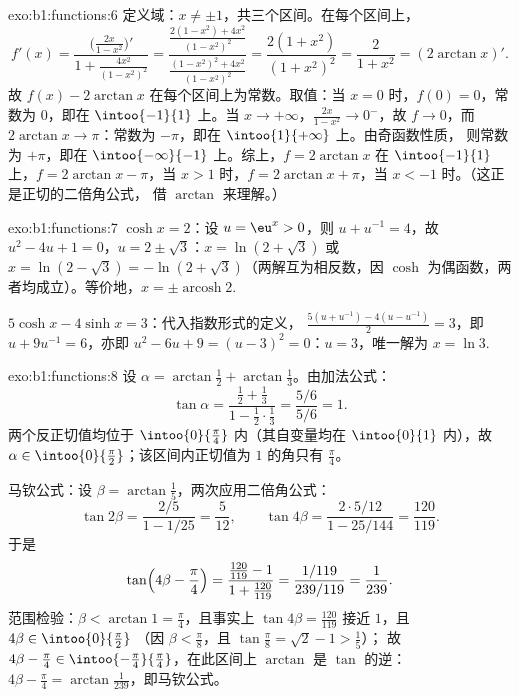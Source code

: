 \begin{solution}{exo:b1:functions:6}
定义域：$x \neq \pm 1$，共三个区间。在每个区间上，
\[
f'(x) = \frac{\bigl(\frac{2x}{1-x^2}\bigr)'}{1 +
\frac{4x^2}{(1-x^2)^2}}
= \frac{\frac{2(1-x^2) + 4x^2}{(1-x^2)^2}}
{\frac{(1-x^2)^2 + 4x^2}{(1-x^2)^2}}
= \frac{2(1 + x^2)}{(1 + x^2)^2} = \frac{2}{1 + x^2}
= (2\arctan x)' .
\]
故 $f(x) - 2\arctan x$ 在每个区间上为常数。取值：当 $x =
0$ 时，$f(0) = 0$，常数为 $0$，即在 $\intoo{-1}{1}$ 上。当 $x \to
+\infty$，$\frac{2x}{1-x^2} \to 0^-$，故 $f \to 0$，而 $2\arctan x
\to \pi$：常数为 $-\pi$，即在 $\intoo{1}{+\infty}$ 上。由奇函数性质，
则常数为 $+\pi$，即在 $\intoo{-\infty}{-1}$ 上。综上，$f = 2\arctan x$ 在
$\intoo{-1}{1}$ 上，$f = 2\arctan x - \pi$，当 $x > 1$ 时，$f = 2\arctan x +
\pi$，当 $x < -1$ 时。（这正是正切的二倍角公式，
借 $\arctan$ 来理解。）
\end{solution}

\begin{solution}{exo:b1:functions:7}
$\cosh x = 2$：设 $u = \eu^x > 0$，则 $u + u^{-1} = 4$，故 $u^2 - 4u +
1 = 0$，$u = 2 \pm \sqrt 3$：$x = \ln(2 + \sqrt 3)$ 或 $x = \ln(2 -
\sqrt 3) = -\ln(2 + \sqrt 3)$（两解互为相反数，因
$\cosh$ 为偶函数，两者均成立）。等价地，$x = \pm
\operatorname{arcosh} 2$.

$5\cosh x - 4\sinh x = 3$：代入指数形式的定义，
$\frac{5(u + u^{-1}) - 4(u - u^{-1})}{2} = 3$，即 $u + 9u^{-1} =
6$，亦即 $u^2 - 6u + 9 = (u - 3)^2 = 0$：$u = 3$，唯一解为 $x =
\ln 3$.
\end{solution}

\begin{solution}{exo:b1:functions:8}
设 $\alpha = \arctan\frac12 + \arctan\frac13$。由加法公式：
\[
\tan\alpha = \frac{\frac12 + \frac13}{1 - \frac12\cdot\frac13}
= \frac{5/6}{5/6} = 1 .
\]
两个反正切值均位于 $\intoo{0}{\frac\pi4}$ 内（其自变量均在
$\intoo{0}{1}$ 内），故 $\alpha \in \intoo{0}{\frac\pi2}$；该区间内正切值为
$1$ 的角只有 $\frac\pi4$。

马钦公式：设 $\beta = \arctan\frac15$，两次应用二倍角公式：
\[
\tan 2\beta = \frac{2/5}{1 - 1/25} = \frac{5}{12},
\qquad
\tan 4\beta = \frac{2 \cdot 5/12}{1 - 25/144} = \frac{120}{119}.
\]
于是
\[
\tan\Bigl(4\beta - \frac\pi4\Bigr)
= \frac{\frac{120}{119} - 1}{1 + \frac{120}{119}}
= \frac{1/119}{239/119} = \frac{1}{239}.
\]
范围检验：$\beta < \arctan 1 = \frac\pi4$，且事实上 $\tan 4\beta =
\frac{120}{119}$ 接近 $1$，且 $4\beta \in \intoo{0}{\frac\pi2}$
（因 $\beta < \frac\pi8$，且 $\tan\frac\pi8 = \sqrt 2 - 1 > \frac15$）；
故 $4\beta - \frac\pi4 \in \intoo{-\frac\pi4}{\frac\pi4}$，在此区间上
$\arctan$ 是 $\tan$ 的逆：$4\beta - \frac\pi4 =
\arctan\frac{1}{239}$，即马钦公式。
\end{solution}

